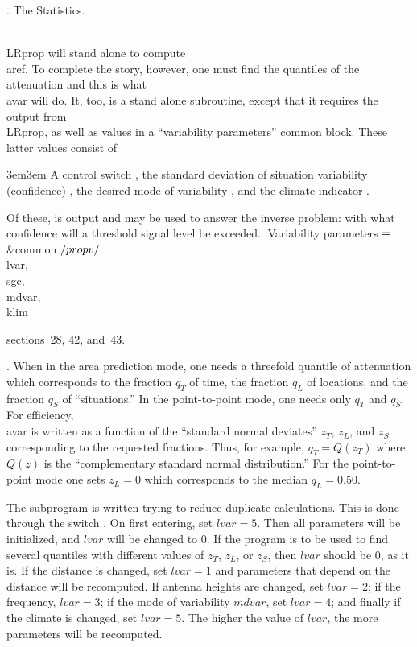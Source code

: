 .  The Statistics.

\\{LRprop} will stand alone to compute \\{aref}.  To complete the story,
however, one must find the quantiles of the attenuation and this is what
\\{avar} will do.  It, too, is a stand alone subroutine, except that it
requires the output from \\{LRprop}, as well as values in a ``variability
parameters'' common block.  These latter values consist of\par
{\parskip 0pt\parindent 0pt\leftskip 3em\rightskip 3em
  A control switch , the standard deviation of situation
variability
  (confidence) , the desired mode of variability , and the
  climate indicator .\par}
Of these,  is output and may be used to answer the inverse
problem:
with what confidence will a threshold signal level be exceeded.
\WY\WP\4\4:Variability parameters\X \X${}\equiv{}$\7
\&{common} \1 ${}{/}\\{propv}{/}$ \\{lvar}, \\{sgc}, \\{mdvar}, \\{klim}\2\WY%
\par
\WU sections~28, 42, and~43.\fi %

. When in the area prediction mode, one needs a threefold quantile of
attenuation which corresponds to the fraction $q_T$ of time, the fraction
$q_L$ of locations, and the fraction $q_S$ of ``situations.''  In the
point-to-point mode, one needs only $q_T$ and $q_S$.  For efficiency,
\\{avar} is written as a function of the ``standard normal deviates''
$z_T$, $z_L$, and $z_S$ corresponding to the requested fractions.  Thus,
for example, $q_T=Q(z_T)$ where $Q(z)$ is the ``complementary standard
normal distribution.''  For the point-to-point mode one sets $z_L=0$ which
corresponds to the median $q_L=0.50$.

The subprogram is written trying to reduce duplicate calculations.  This
is done through the switch .  On first entering, set $lvar=5$.
Then
all parameters will be initialized, and $lvar$ will be changed to 0.  If
the program is to be used to find several quantiles with different values
of $z_T$, $z_L$, or $z_S$, then $lvar$ should be 0, as it is.  If the
distance is changed, set $lvar=1$ and parameters that depend on the distance
will be recomputed.  If antenna heights are changed, set $lvar=2$; if the
frequency, $lvar=3$; if the mode of variability $mdvar$, set $lvar=4$; and
finally if the climate is changed, set $lvar=5$.  The higher the value of
$lvar$, the more parameters will be recomputed.

